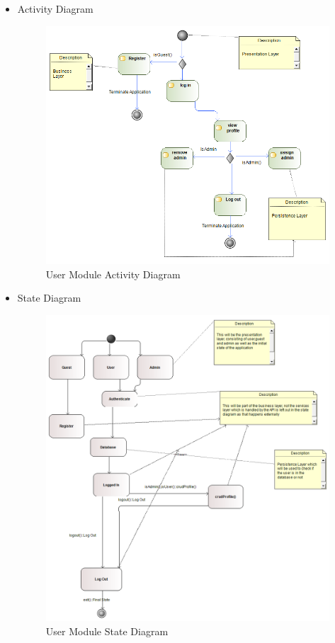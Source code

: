 \documentclass{article}
\begin{document}
\begin{itemize}
 				\item Activity Diagram
 				\begin{center}
 					\begin{figure}[!h]
 						\includegraphics[scale=0.4]{uad.png}
 						\caption{User Module Activity Diagram}
 					\end{figure}
 				\end{center}
 				\pagebreak
 				
				\item State Diagram
				\begin{center}
					\begin{figure}[!h]
						\includegraphics[scale=0.5]{smdu.png}
						\caption{User Module State Diagram}
					\end{figure}
				\end{center}
			
 		\end{itemize}
	
\end{document}
